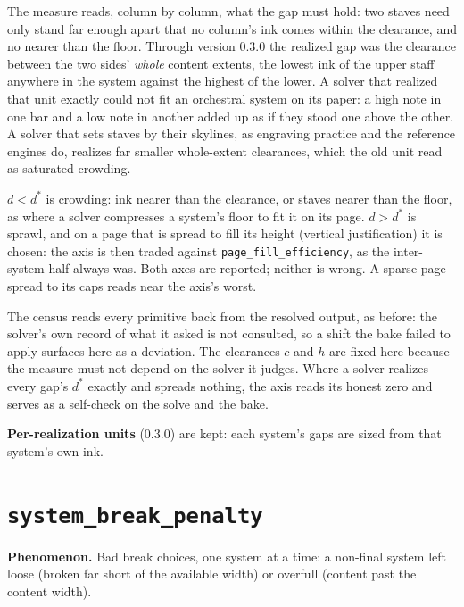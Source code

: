 \documentclass[11pt,letterpaper]{report}
\begin{document}
\begin{rationale}
The measure reads, column by column, what the gap must hold: two staves need
only stand far enough apart that no column's ink comes within the clearance,
and no nearer than the floor. Through version 0.3.0 the realized gap was the
clearance between the two sides' \emph{whole} content extents, the lowest ink
of the upper staff anywhere in the system against the highest of the lower.
A solver that realized that unit exactly could not fit an orchestral system
on its paper: a high note in one bar and a low note in another added up as if
they stood one above the other. A solver that sets staves by their skylines,
as engraving practice and the reference engines do, realizes far smaller
whole-extent clearances, which the old unit read as saturated crowding.

$d < d^{*}$ is crowding: ink nearer than the clearance, or staves nearer than
the floor, as where a solver compresses a system's floor to fit it on its
page. $d > d^{*}$ is sprawl, and on a page that is spread to fill its height
(vertical justification) it is chosen: the axis is then traded against
\texttt{page\_fill\_efficiency}, as the inter-system half always was. Both
axes are reported; neither is wrong. A sparse page spread to its caps reads
near the axis's worst.

The census reads every primitive back from the resolved output, as before:
the solver's own record of what it asked is not consulted, so a shift the
bake failed to apply surfaces here as a deviation. The clearances $c$ and $h$
are fixed here because the measure must not depend on the solver it judges.
Where a solver realizes every gap's $d^{*}$ exactly and spreads nothing, the
axis reads its honest zero and serves as a self-check on the solve and the
bake.

\textbf{Per-realization units} (0.3.0) are kept: each system's gaps are sized
from that system's own ink.
\end{rationale}

\section{\texttt{system\_break\_penalty}}
\label{sec:metrics:system-break}

\textbf{Phenomenon.} Bad break choices, one system at a time: a non-final
system left loose (broken far short of the available width) or overfull
(content past the content width).
\end{document}
